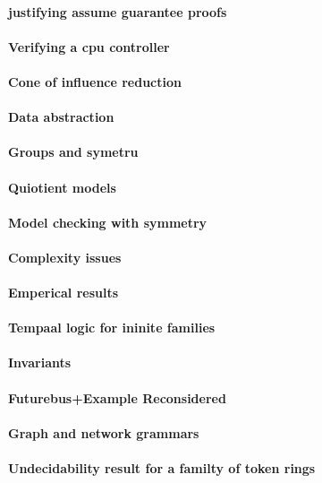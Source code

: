 \paragraph{justifying assume guarantee proofs}
\paragraph{Verifying a cpu controller}
\paragraph{Cone of influence reduction}
\paragraph{Data abstraction}
\paragraph{Groups and symetru}
\paragraph{Quiotient models}
\paragraph{Model checking with symmetry}
\paragraph{Complexity issues}
\paragraph{Emperical results}
\paragraph{Tempaal logic for ininite families}
\paragraph{Invariants}
\paragraph{Futurebus+Example Reconsidered}
\paragraph{Graph and network grammars}
\paragraph{Undecidability result for a familty of token rings}
